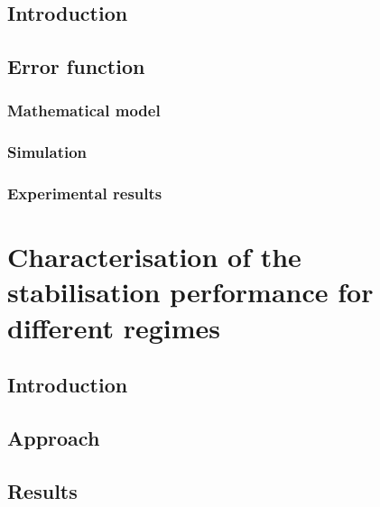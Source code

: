 \subsection{Introduction}

\subsection{Error function}

\subsubsection{Mathematical model}

\subsubsection{Simulation}

\subsubsection{Experimental results}

\section{Characterisation of the stabilisation performance for different regimes}

\subsection{Introduction}

\subsection{Approach}

\subsection{Results}